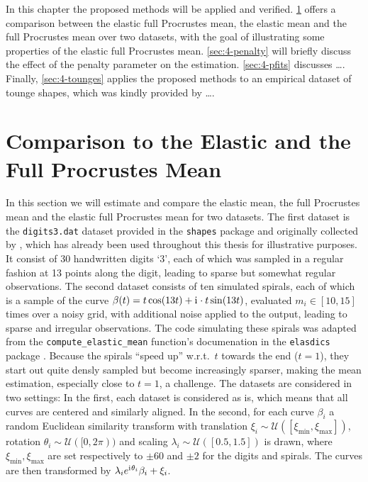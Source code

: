 \label{sec:4}
In this chapter the proposed methods will be applied and verified.
\cref{sec:4-means} offers a comparison between the elastic full Procrustes mean, the elastic mean and the full Procrustes mean over two datasets, with the goal of illustrating some properties of the elastic full Procrustes mean.
\cref{sec:4-penalty} will briefly discuss the effect of the penalty parameter on the estimation.
\cref{sec:4-pfits} discusses \dots .
Finally, \cref{sec:4-tounges} applies the proposed methods to an empirical dataset of tounge shapes, which was kindly provided by \dots.


\section{Comparison to the Elastic and the Full Procrustes Mean}
\label{sec:4-means}
In this section we will estimate and compare the elastic mean, the full Procrustes mean and the elastic full Procrustes mean for two datasets.
The first dataset is the \texttt{digits3.dat} dataset provided in the \texttt{shapes} package \parencite{shapes} and originally collected by \cite{Anderson1997}, which has already been used throughout this thesis for illustrative purposes.
It consist of 30 handwritten digits \enquote*{3}, each of which was sampled in a regular fashion at 13 points along the digit, leading to sparse but somewhat regular observations.
The second dataset consists of ten simulated spirals, each of which is a sample of the curve $\beta(t) = t \cos(13t) + \mathrm{i}\mkern1mu \cdot t \sin(13t)$, evaluated $m_i \in [10,15]$ times over a noisy grid, with additional noise applied to the output, leading to sparse and irregular observations.
The code simulating these spirals was adapted from the \texttt{compute\_elastic\_mean} function's documenation in the \texttt{elasdics} package \parencite{elasdics}.
Because the spirals \enquote{speed up} w.r.t.\ $t$ towards the end ($t = 1$), they start out quite densly sampled but become increasingly sparser, making the mean estimation, especially close to $t=1$, a challenge.
The datasets are considered in two settings:
In the first, each dataset is considered as is, which means that all curves are centered and similarly aligned.
In the second, for each curve $\beta_i$ a random Euclidean similarity transform with translation $\xi_i \sim \mathcal{U}([\xi_\mathrm{min}, \xi_\mathrm{max}])$, rotation $\theta_i \sim \mathcal{U}([0,2\pi))$ and scaling $\lambda_i \sim \mathcal{U}([0.5,1.5])$ is drawn, where $\xi_\mathrm{min}, \xi_\mathrm{max}$ are set respectively to $\pm 60$ and $\pm 2$ for the digits and spirals.
The curves are then transformed by $\lambda_i e^{\mathrm{i}\mkern1mu \theta_i} \beta_i + \xi_i$.


